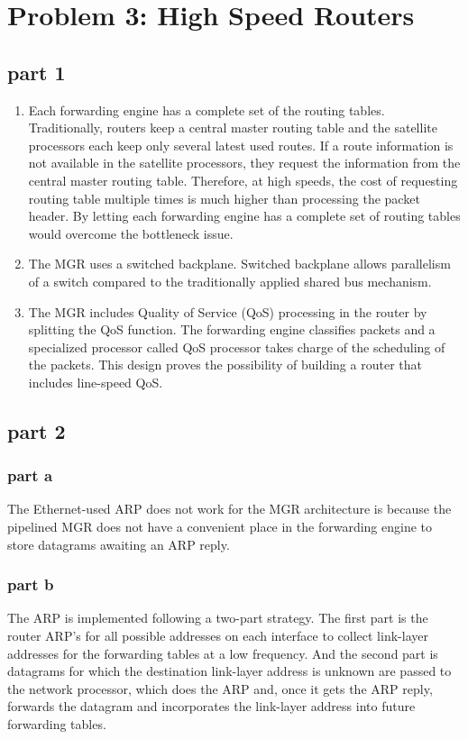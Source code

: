 \section{Problem 3: High Speed Routers}

\subsection{part 1}

\begin{enumerate}
\item Each forwarding engine has a complete set of the routing tables. Traditionally, routers keep a central master routing table and the satellite processors each keep only several latest used routes. If a route information is not available in the satellite processors, they request the information from the central master routing table. Therefore, at high speeds, the cost of requesting routing table multiple times is much higher than processing the packet header. By letting each forwarding engine has a complete set of routing tables would overcome the bottleneck issue.
\item The MGR uses a switched backplane. Switched backplane allows parallelism of a switch compared to the traditionally applied shared bus mechanism.
\item The MGR includes Quality of Service (QoS) processing in the router by splitting the QoS function. The forwarding engine classifies packets and a specialized processor called QoS processor takes charge of the scheduling of the packets. This design proves the possibility of building a router that includes line-speed QoS.
\end{enumerate}

\subsection{part 2}

\subsubsection{part a}
The Ethernet-used ARP does not work for the MGR architecture is because the pipelined MGR does not have a convenient place in the forwarding engine to store datagrams awaiting an ARP reply.

\subsubsection{part b}
The ARP is implemented following a two-part strategy. The first part is the router ARP's for all possible addresses on each interface to collect link-layer addresses for the forwarding tables at a low frequency. And the second part is datagrams for which the destination link-layer address is unknown are passed to the network processor, which does the ARP and, once it gets the ARP reply, forwards the datagram and incorporates the link-layer address into future forwarding tables.

